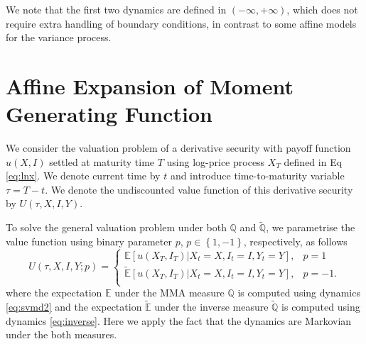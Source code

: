 \documentclass[11pt,a4paper] {article}
\begin{document}
We note that the first two dynamics are defined in $(-\infty, +\infty)$, which does not require extra handling of boundary conditions, in contrast to some affine models for the variance process. 








\section{Affine Expansion of Moment Generating Function}\label{sec:affine_expansion}

We consider the valuation problem of a derivative security with payoff function $u(X,I)$ settled at maturity time $T$ using log-price process $X_{T}$ defined in Eq \eqref{eq:lnx}. We denote current time by $t$ and introduce time-to-maturity variable $\tau=T-t$. We denote the undiscounted value function of this derivative security by $U(\tau,X,I,Y)$.

To solve the general valuation problem under both $\mathbb{Q}$ and $\tilde{\mathbb{Q}}$, we parametrise the value function using binary parameter $p$, $p\in\left\{1,-1\right\}$, respectively, as follows
\begin{equation} \label{eq:val}
U(\tau,X,I,Y; p) = 
\begin{cases}
\mathbb{E}[u(X_T,I_T)\left.\right|X_t=X, I_t=I, Y_t=Y], & p=1\\
\tilde{\mathbb{E}}[u(X_T,I_T)\left.\right|X_t=X, I_t=I, Y_t=Y], & p=-1.\\
\end{cases}
\end{equation}
where the expectation $\mathbb{E}$ under the MMA measure $\mathbb{Q}$ is computed using  dynamics \eqref{eq:svmd2} and the expectation $\tilde{\mathbb{E}}$ under the inverse measure $\tilde{\mathbb{Q}}$ is computed using dynamics \eqref{eq:inverse}. Here we apply the fact that the dynamics are Markovian under the both measures.
\end{document}
